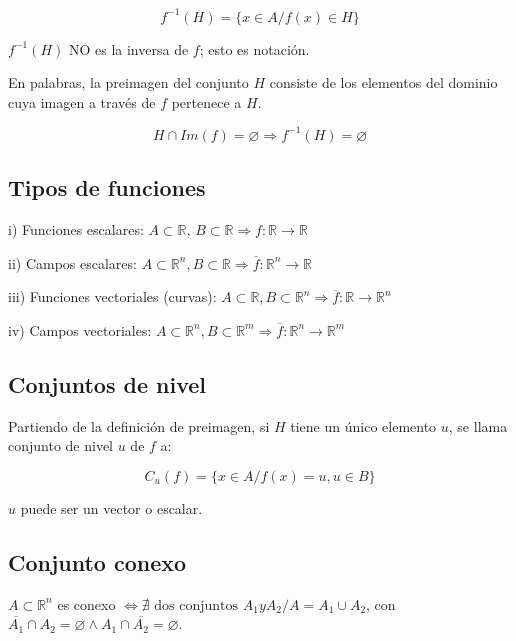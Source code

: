 \documentclass{article}
\renewcommand{\Bbb}{\mathbb}
\begin{document}
\begin{equation}
f^{-1}(H) = \{ x \in A / f(x) \in H \}
\end{equation}

$f^{-1}(H)$ NO es la inversa de $f$; esto es notación.

En palabras, la preimagen del conjunto $H$ consiste de los elementos del dominio cuya imagen a través de $f$ pertenece a $H$.

\begin{equation}
H \cap Im(f) = \varnothing \Longrightarrow f^{-1}(H) = \varnothing
\end{equation}

\subsection{Tipos de funciones}

i) Funciones escalares: $A \subset \Bbb R$, $B \subset \Bbb R \Longrightarrow f: \Bbb R \rightarrow \Bbb R$

ii) Campos escalares: $A \subset \Bbb R^n, B \subset \Bbb R \Longrightarrow \overline{f}: \Bbb R^n \rightarrow \Bbb R$

iii) Funciones vectoriales (curvas): $A \subset \Bbb R, B \subset \Bbb R^n \Longrightarrow \overline{f}: \Bbb R \rightarrow \Bbb R^n$

iv) Campos vectoriales: $A \subset \Bbb R^n, B \subset \Bbb R^m \Longrightarrow \overline{f}: \Bbb R^n \rightarrow \Bbb R^m$

\subsection{Conjuntos de nivel}

Partiendo de la definición de preimagen, si $H$ tiene un único elemento $u$, se llama conjunto de nivel $u$ de $f$ a:

\begin{equation}
C_u(f) = \{ x \in A / f(x) = u, u \in B \}
\end{equation}

$u$ puede ser un vector o escalar.

\subsection{Conjunto conexo}

$A \subset \Bbb R^n$ es conexo $\Longleftrightarrow \nexists \text{ dos conjuntos } A_1 y A_2 / A = A_1 \cup A_2$, con $\overline{A_1} \cap A_2 = \varnothing \wedge A_1 \cap \overline{A_2} = \varnothing$.
\end{document}
